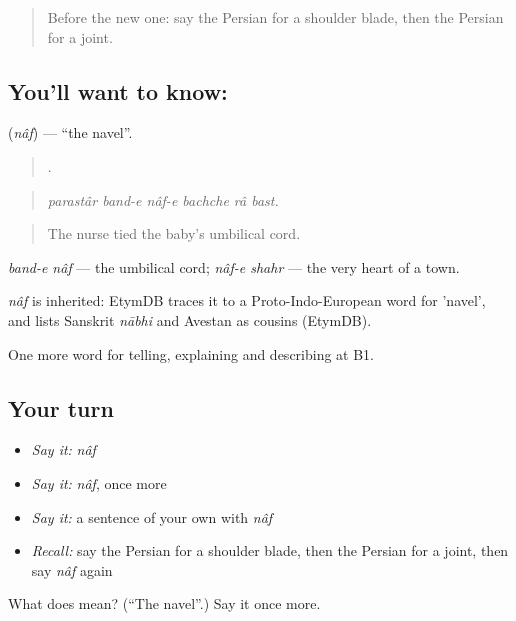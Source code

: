 \begin{quote}
Before the new one: say the Persian for a shoulder blade, then the Persian for a joint.
\end{quote}

\subsection*{You'll want to know: }
\textbf{} (\emph{nâf}) — \textquotedblleft{}the navel\textquotedblright{}.

\begin{quote}
     .
\end{quote}

\begin{quote}
\emph{parastâr band-e nâf-e bachche râ bast.}
\end{quote}

\begin{quote}
The nurse tied the baby's umbilical cord.
\end{quote}

\emph{band-e nâf} — the umbilical cord; \emph{nâf-e shahr} — the very heart of a town.

\begin{cousinweb}
\emph{nâf} is inherited: EtymDB traces it to a Proto-Indo-European word for 'navel', and lists Sanskrit \emph{nābhi} and Avestan as cousins (EtymDB).
\end{cousinweb}

\begin{grammarlens}[title={What you've built}]
One more word for telling, explaining and describing at B1.
\end{grammarlens}

\subsection*{Your turn}
\begin{itemize}
\raggedright
  \item \emph{Say it:} \emph{nâf}
  \item \emph{Say it:} \emph{nâf}, once more
  \item \emph{Say it:} a sentence of your own with \emph{nâf}
  \item \emph{Recall:} say the Persian for a shoulder blade, then the Persian for a joint, then say \emph{nâf} again
\end{itemize}

\begin{tcolorbox}[breakable,colback=teal!4,colframe=teal!35!black,title={Before you move on}]
What does  mean? (\textquotedblleft{}The navel\textquotedblright{}.) Say it once more.
\end{tcolorbox}
